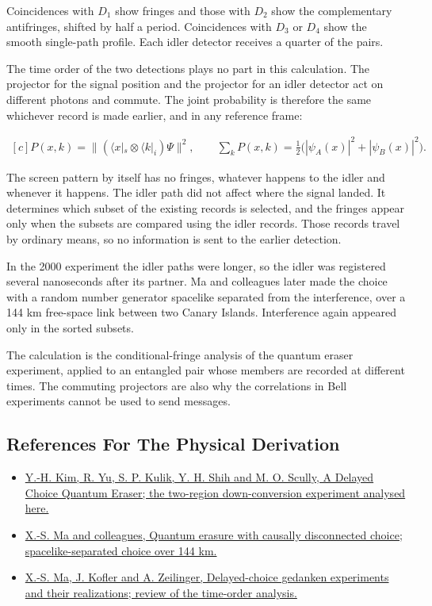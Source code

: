 \documentclass[11pt,oneside]{book}
\newenvironment{centeredalign}{\[\begin{gathered}[c]}{\end{gathered}\]}
\begin{document}
Coincidences with \(D_1\) show fringes and those with \(D_2\) show the complementary antifringes, shifted by half a period. Coincidences with \(D_3\) or \(D_4\) show the smooth single-path profile. Each idler detector receives a quarter of the pairs.

The time order of the two detections plays no part in this calculation. The projector for the signal position and the projector for an idler detector act on different photons and commute. The joint probability is therefore the same whichever record is made earlier, and in any reference frame:

\begin{centeredalign}
P(x,k)=\big\|(\langle x|_s\otimes\langle k|_i)\Psi\big\|^2,\qquad
\sum_kP(x,k)=\tfrac12\big(|\psi_A(x)|^2+|\psi_B(x)|^2\big).
\end{centeredalign}

The screen pattern by itself has no fringes, whatever happens to the idler and whenever it happens. The idler path did not affect where the signal landed. It determines which subset of the existing records is selected, and the fringes appear only when the subsets are compared using the idler records. Those records travel by ordinary means, so no information is sent to the earlier detection.

In the 2000 experiment the idler paths were longer, so the idler was registered several nanoseconds after its partner. Ma and colleagues later made the choice with a random number generator spacelike separated from the interference, over a 144 km free-space link between two Canary Islands. Interference again appeared only in the sorted subsets.

The calculation is the conditional-fringe analysis of the quantum eraser experiment, applied to an entangled pair whose members are recorded at different times. The commuting projectors are also why the correlations in Bell experiments cannot be used to send messages.

\subsection*{References For The Physical Derivation}
\begin{itemize}
\item \href{https://arxiv.org/abs/quant-ph/9903047}{Y.-H. Kim, R. Yu, S. P. Kulik, Y. H. Shih and M. O. Scully, A Delayed Choice Quantum Eraser; the two-region down-conversion experiment analysed here.}
\item \href{https://arxiv.org/abs/1206.6578}{X.-S. Ma and colleagues, Quantum erasure with causally disconnected choice; spacelike-separated choice over 144 km.}
\item \href{https://arxiv.org/abs/1407.2930}{X.-S. Ma, J. Kofler and A. Zeilinger, Delayed-choice gedanken experiments and their realizations; review of the time-order analysis.}
\end{itemize}
\end{document}
